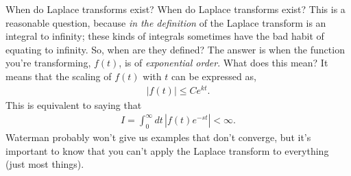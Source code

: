 \documentclass[11pt]{article}
\theoremstyle{mystyle}
\begin{document}
\begin{psremark}{When do Laplace transforms exist?}{}
    When do Laplace transforms exist? This is a reasonable
    question, because \emph{in the definition} of the Laplace
    transform is an integral to infinity; these kinds of integrals
    sometimes have the bad habit of equating to infinity.
    So, when are they defined? The answer is when the
    function you're transforming, $f(t)$, is of
    \emph{exponential order}. What does this mean?
    It means that the scaling of $f(t)$ with $t$
    can be expressed as,
    \begin{align*}
        |f(t)| \leq Ce^{kt}.
    \end{align*}
    This is equivalent to saying that
    \begin{align*}
        I = \int_0^\infty dt \, |f(t) e^{-st}| < \infty.
    \end{align*}
    Waterman probably won't give us examples that don't
    converge, but it's important to know that you can't
    apply the Laplace transform to everything (just
    most things).
\end{psremark}
\end{document}
